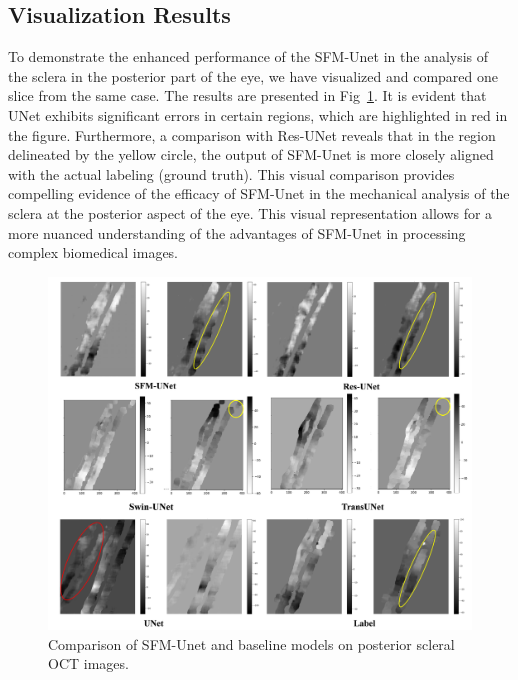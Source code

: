\documentclass[AMA,Times1COL]{WileyNJDv5} %
\begin{document}
\subsection{Visualization Results}
To demonstrate the enhanced performance of the SFM-Unet in the analysis of the sclera in the posterior part of the eye, we have visualized and compared one slice from the same case. The results are presented in Fig~\ref{fig:3}. It is evident that UNet exhibits significant errors in certain regions, which are highlighted in red in the figure. Furthermore, a comparison with Res-UNet reveals that in the region delineated by the yellow circle, the output of SFM-Unet is more closely aligned with the actual labeling (ground truth). This visual comparison provides compelling evidence of the efficacy of SFM-Unet in the mechanical analysis of the sclera at the posterior aspect of the eye. This visual representation allows for a more nuanced understanding of the advantages of SFM-Unet in processing complex biomedical images.
\begin{figure}[htbp]
\centerline{\includegraphics[width=0.9\linewidth]{Fig/fig3.png}}
\caption{Comparison of SFM-Unet and baseline models on posterior scleral OCT images.}
\label{fig:3}
\end{figure}
\end{document}
